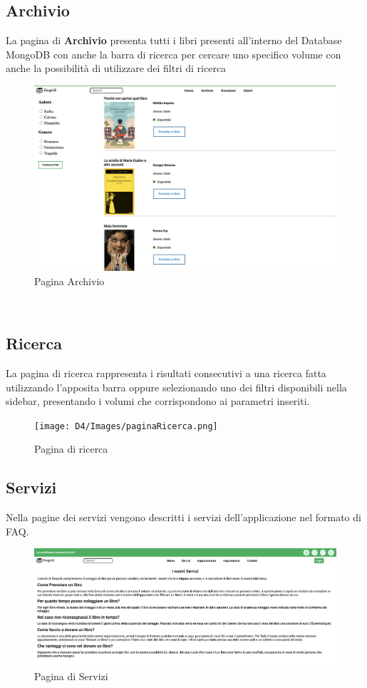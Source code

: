 \documentclass{article}
\begin{document}
\subsection{Archivio} \label{archivio}


La pagina di \textbf{Archivio} presenta tutti i libri presenti all'interno del Database MongoDB con anche la barra di ricerca per cercare uno specifico volume con anche la possibilità di utilizzare dei filtri di ricerca
\begin{figure}[H]
    \centering
    \includegraphics[width=130mm]{D4/Images/Archivio.png}
    \caption{Pagina Archivio} 
\end{figure}
\\

\subsection{Ricerca}
La pagina di ricerca rappresenta i risultati consecutivi a una ricerca fatta utilizzando l'apposita barra oppure selezionando uno dei filtri disponibili nella sidebar, presentando i volumi che corrispondono ai parametri inseriti.
\begin{figure} [H]
    \centering
    \texttt{[image: D4/Images/paginaRicerca.png]}
    \caption{Pagina di ricerca}
\end{figure}

\subsection{Servizi}
Nella pagine dei servizi vengono descritti i servizi dell'applicazione nel formato di FAQ.

\begin{figure}[H]
    \centering
    \includegraphics[width=130mm]{D4/Images/Servizi.png}
    \caption{Pagina di Servizi}
\end{figure}
\end{document}

